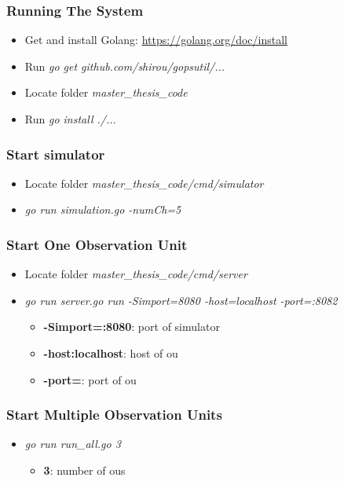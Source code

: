 \documentclass[USenglish]{uit-thesis}
\begin{document}
\subsubsection{Running The System}

\begin{itemize}
\item Get and install Golang: \url{https://golang.org/doc/install}
\item Run \textit{go get github.com/shirou/gopsutil/...}
\item Locate folder \textit{master\_thesis\_code}
\item Run \textit{go install ./...}
\end{itemize}

\subsubsection{Start simulator}
\begin{itemize}
\item Locate folder \textit{master\_thesis\_code/cmd/simulator}
\item \textit{go run simulation.go -numCh=5}
\end{itemize}

\subsubsection{Start One Observation Unit}
\begin{itemize}
\item Locate folder \textit{master\_thesis\_code/cmd/server}
\item \textit{go run server.go run -Simport=8080 -host=localhost -port=:8082}
\begin{itemize}
\item \textbf{-Simport=:8080}: port of simulator
\item \textbf{-host:localhost}: host of \gls{ou}
\item \textbf{-port=}: port of \gls{ou}
\end{itemize}
\end{itemize}

\subsubsection{Start Multiple Observation Units}
\begin{itemize}
\item \textit{go run run\_all.go 3}
\begin{itemize}
\item \textbf{3}: number of \glspl{ou}
\end{itemize}
\end{itemize}

\backmatter
\end{document}
